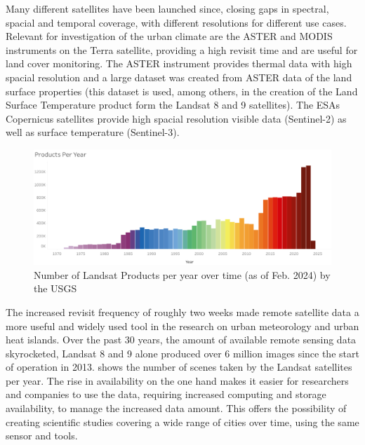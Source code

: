 \documentclass[12pt,a4paper, english,twoside]{scrartcl}
\begin{document}
  Many different satellites have been launched since, closing gaps in spectral, spacial and temporal coverage, with different resolutions for different use cases. 
  Relevant for investigation of the urban climate are the ASTER and MODIS instruments on the Terra satellite, providing a high revisit time and are useful for land cover monitoring. 
  The ASTER instrument provides thermal data with high spacial resolution and a large dataset was created from ASTER data of the land surface properties (this dataset is used, among others, in the creation of the Land Surface Temperature product form the Landsat 8 and 9 satellites).
  The \glspl{ESA} Copernicus satellites provide high spacial resolution visible data (Sentinel-2) as well as surface temperature (Sentinel-3).\\
  \begin{figure}[!htbp]
    \centering
    \includegraphics[width=\textwidth]{img/LandsatDataArchiveStatsProductsPerYear.png}
    \caption{Number of Landsat Products per year over time (as of Feb. 2024) by the \gls{USGS}~\autocite{landsatstats}\label{fig:landsatproductsovertime}}
  \end{figure}
  \noindent
  The increased revisit frequency of roughly two weeks made remote satellite data a more useful and widely used tool in the research on urban meteorology and urban heat islands.
  Over the past 30 years, the amount of available remote sensing data skyrocketed, Landsat 8 and 9 alone produced over 6 million images since the start of operation in 2013.  shows the number of scenes taken by the Landsat satellites per year.
  The rise in availability on the one hand makes it easier for researchers and companies to use the data, requiring increased computing and storage availability, to manage the increased data amount.
  This offers the possibility of creating scientific studies covering a wide range of cities over time, using the same sensor and tools. 
\end{document}
